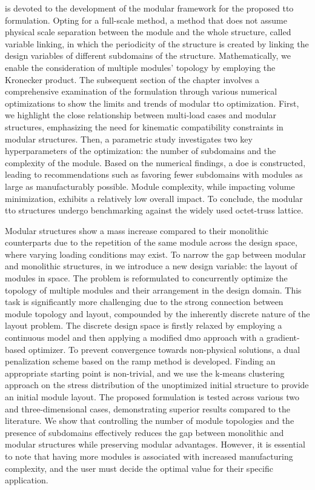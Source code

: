  is devoted to the development of the modular framework for the proposed \gls{tto} formulation. Opting for a full-scale method, a method that does not assume physical scale separation between the module and the whole structure, called variable linking, in which the periodicity of the structure is created by linking the design variables of different subdomains of the structure. Mathematically, we enable the consideration of multiple modules' topology by employing the Kronecker product. The subsequent section of the chapter involves a comprehensive examination of the formulation through various numerical optimizations to show the limits and trends of modular \gls{tto} optimization. First, we highlight the close relationship between multi-load cases and modular structures, emphasizing the need for kinematic compatibility constraints in modular structures. Then, a parametric study investigates two key hyperparameters of the optimization: the number of subdomains and the complexity of the module. Based on the numerical findings, a \gls{doe} is constructed, leading to recommendations such as favoring fewer subdomains with modules as large as manufacturably possible. Module complexity, while impacting volume minimization, exhibits a relatively low overall impact. To conclude, the modular \gls{tto} structures undergo benchmarking against the widely used octet-truss lattice.

Modular structures show a mass increase compared to their monolithic counterparts due to the repetition of the same module across the design space, where varying loading conditions may exist. To narrow the gap between modular and monolithic structures, in  we introduce a new design variable: the layout of modules in space. The problem is reformulated to concurrently optimize the topology of multiple modules and their arrangement in the design domain. This task is significantly more challenging due to the strong connection between module topology and layout, compounded by the inherently discrete nature of the layout problem. The discrete design space is firstly relaxed by employing a continuous model and then applying a modified \gls{dmo} approach with a gradient-based optimizer. To prevent convergence towards non-physical solutions, a dual penalization scheme based on the \gls{ramp} method is developed. Finding an appropriate starting point is non-trivial, and we use the k-means clustering approach on the stress distribution of the unoptimized initial structure to provide an initial module layout. The proposed formulation is tested across various two and three-dimensional cases, demonstrating superior results compared to the literature. We show that controlling the number of module topologies and the presence of subdomains effectively reduces the gap between monolithic and modular structures while preserving modular advantages. However, it is essential to note that having more modules is associated with increased manufacturing complexity, and the user must decide the optimal value for their specific application.

